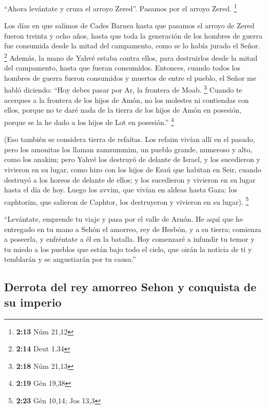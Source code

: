 \begin{paracol}{2}
 ``Ahora levántate y cruza el arroyo Zered''. Pasamos por
el arroyo Zered. \footnote{\textbf{2:13} Núm 21,12}

 Los días en que salimos de Cades Barnea hasta que
pasamos el arroyo de Zered fueron treinta y ocho años, hasta que toda la
generación de los hombres de guerra fue consumida desde la mitad del
campamento, como se lo había jurado el Señor. \footnote{\textbf{2:14}
  Deut 1,34}  Además, la mano de Yahvé estaba contra
ellos, para destruirlos desde la mitad del campamento, hasta que fueran
consumidos.  Entonces, cuando todos los hombres de guerra
fueron consumidos y muertos de entre el pueblo,  el Señor
me habló diciendo:  ``Hoy debes pasar por Ar, la frontera
de Moab. \footnote{\textbf{2:18} Núm 21,13}  Cuando te
acerques a la frontera de los hijos de Amón, no los molestes ni
contiendas con ellos, porque no te daré nada de la tierra de los hijos
de Amón en posesión, porque se la he dado a los hijos de Lot en
posesión.'' \footnote{\textbf{2:19} Gén 19,38}

 (Eso también se considera tierra de refaítas. Los refaim
vivían allí en el pasado, pero los amonitas los llaman zamzummim,
 un pueblo grande, numeroso y alto, como los anakim; pero
Yahvé los destruyó de delante de Israel, y los sucedieron y vivieron en
su lugar,  como hizo con los hijos de Esaú que habitan en
Seir, cuando destruyó a los horeos de delante de ellos; y los sucedieron
y vivieron en su lugar hasta el día de hoy.  Luego los
avvim, que vivían en aldeas hasta Gaza: los caphtorim, que salieron de
Caphtor, los destruyeron y vivieron en su lugar). \footnote{\textbf{2:23}
  Gén 10,14; Jos 13,3}

 ``Levántate, emprende tu viaje y pasa por el valle de
Arnón. He aquí que he entregado en tu mano a Sehón el amorreo, rey de
Hesbón, y a su tierra; comienza a poseerla, y enfréntate a él en la
batalla.  Hoy comenzaré a infundir tu temor y tu miedo a
los pueblos que están bajo todo el cielo, que oirán la noticia de ti y
temblarán y se angustiarán por tu causa.''

\hypertarget{derrota-del-rey-amorreo-sehon-y-conquista-de-su-imperio}{%
\subsection{Derrota del rey amorreo Sehon y conquista de su
imperio}\label{derrota-del-rey-amorreo-sehon-y-conquista-de-su-imperio}}


\end{paracol}
